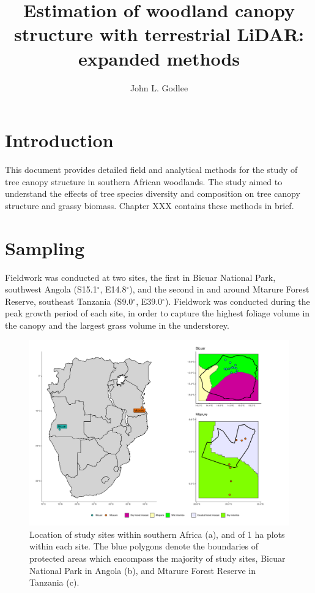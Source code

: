 \documentclass[11pt,a4paper]{article}
\title{Estimation of woodland canopy structure with terrestrial LiDAR: expanded methods}
\author{John L. Godlee}
\date{}
\begin{document}
\maketitle{}

\tableofcontents{}

\section{Introduction}

This document provides detailed field and analytical methods for the study of tree canopy structure in southern African woodlands. The study aimed to understand the effects of tree species diversity and composition on tree canopy structure and grassy biomass. Chapter XXX contains these methods in brief.

\section{Sampling}

Fieldwork was conducted at two sites, the first in Bicuar National Park, southwest Angola (S15.1$^\circ$, E14.8$^\circ$), and the second in and around Mtarure Forest Reserve, southeast Tanzania (S9.0$^\circ$, E39.0$^\circ$). Fieldwork was conducted during the peak growth period of each site, in order to capture the highest foliage volume in the canopy and the largest grass volume in the understorey.

\begin{figure}[H]
\centering
	\includegraphics[width=\textwidth]{map}
	\caption{Location of study sites within southern Africa (a), and of 1 ha plots within each site. The blue polygons denote the boundaries of protected areas which encompass the majority of study sites, Bicuar National Park in Angola (b), and Mtarure Forest Reserve in Tanzania (c).}
	\label{map}
\end{figure}
\end{document}
